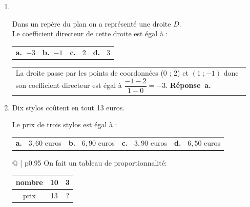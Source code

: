 \begin{enumerate}
\bigskip

\item ~

\begin{minipage}{0.65\linewidth}
Dans un repère du plan on a représenté une droite $D$.\\

Le coefficient directeur de cette droite est égal à :

\begin{tabularx}{\linewidth}{*{4}{X}}
\textbf{a.~}$-3$&\textbf{b.~}$-1$&\textbf{c.~} 2&\textbf{d.~} 3
\end{tabularx}
\end{minipage}
\hfill
\begin{minipage}{0.3\linewidth}
\end{minipage}


\medskip

\begin{tabular}{@{\hspace{0.03\linewidth}} | p{0.95\linewidth}}
La droite passe par les points de coordonnées (0 ; 2) et $(1\;; -1)$ donc son coefficient directeur est égal à $\dfrac{-1-2}{1-0}=-3$.
\hfill\textbf{Réponse~a.}
\end{tabular}

\bigskip

\item Dix stylos coûtent en tout 13 euros.

Le prix de trois stylos est égal à :

\begin{tabularx}{\linewidth}{*{4}{X}}
\textbf{a.~} $3,60$ euros&\textbf{b.~} $6,90$ euros&\textbf{c.~} $3,90$ euros&\textbf{d.~} $6,50$ euros
\end{tabularx}

\medskip

\begin{tabular}{@{\hspace{0.03\linewidth}} | p{0.95\linewidth}}
On fait un tableau de proportionnalité:
\begin{tabular}{|c|c|c|}
\hline
nombre & 10 & 3\\
\hline
prix & 13 & ?\\
\hline
\end{tabular}


\end{tabular}
\end{enumerate}
